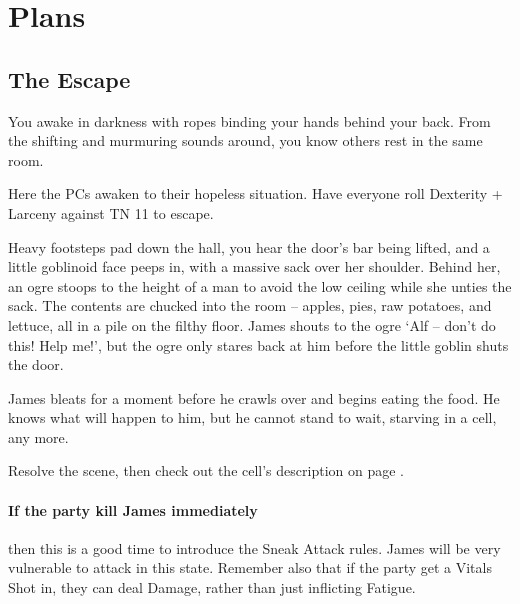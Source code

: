 \section{Plans}

\begin{multicols}{2}

\subsection{The Escape}
\label{escape}

\begin{boxtext}

	You awake in darkness with ropes binding your hands behind your back.
	From the shifting and murmuring sounds around, you know others rest in the same room.

\end{boxtext}

Here the PCs awaken to their hopeless situation.
Have everyone roll Dexterity + Larceny against TN 11 to escape.

\begin{boxtext}

	Heavy footsteps pad down the hall, you hear the door's bar being lifted, and a little goblinoid face peeps in, with a massive sack over her shoulder.
	Behind her, an ogre stoops to the height of a man to avoid the low ceiling while she unties the sack.
	The contents are chucked into the room -- apples, pies, raw potatoes, and lettuce, all in a pile on the filthy floor.
	James shouts to the ogre `Alf -- don't do this! Help me!', but the ogre only stares back at him before the little goblin shuts the door.

\end{boxtext}

James bleats for a moment before he crawls over and begins eating the food.
He knows what will happen to him, but he cannot stand to wait, starving in a cell, any more.

Resolve the scene, then check out the cell's description on page \pageref{entrycell}.

\paragraph{If the party kill James immediately}
then this is a good time to introduce the Sneak Attack rules.
James will be very vulnerable to attack in this state.
Remember also that if the party get a Vitals Shot in, they can deal Damage, rather than just inflicting Fatigue.


\end{multicols}
